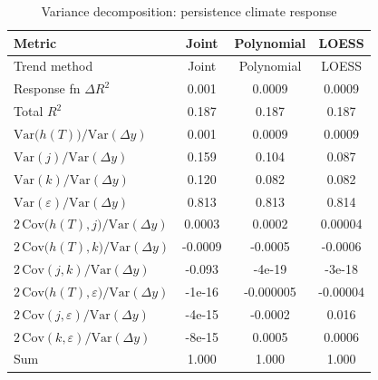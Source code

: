 \begin{table}[htbp]
\centering
\caption{Variance decomposition: persistence climate response}
\label{tab:variance_decomp_persistence}

\small
\begin{tabular}{@{}lccc@{}}
\toprule
Metric & Joint & Polynomial & LOESS \\
\midrule
Trend method & Joint & Polynomial & LOESS \\
\midrule
Response fn $\Delta R^2$ & 0.001 & 0.0009 & 0.0009 \\
Total $R^2$ & 0.187 & 0.187 & 0.187 \\
\midrule
$\mathrm{Var}\!\big(h(T)\big)/\mathrm{Var}(\Delta y)$ & 0.001 & 0.0009 & 0.0009 \\
$\mathrm{Var}(j)/\mathrm{Var}(\Delta y)$ & 0.159 & 0.104 & 0.087 \\
$\mathrm{Var}(k)/\mathrm{Var}(\Delta y)$ & 0.120 & 0.082 & 0.082 \\
$\mathrm{Var}(\varepsilon)/\mathrm{Var}(\Delta y)$ & 0.813 & 0.813 & 0.814 \\
\midrule
$2\,\mathrm{Cov}\!\big(h(T),j\big)/\mathrm{Var}(\Delta y)$ & 0.0003 & 0.0002 & 0.00004 \\
$2\,\mathrm{Cov}\!\big(h(T),k\big)/\mathrm{Var}(\Delta y)$ & -0.0009 & -0.0005 & -0.0006 \\
$2\,\mathrm{Cov}(j,k)/\mathrm{Var}(\Delta y)$ & -0.093 & -4e-19 & -3e-18 \\
$2\,\mathrm{Cov}\!\big(h(T),\varepsilon\big)/\mathrm{Var}(\Delta y)$ & -1e-16 & -0.000005 & -0.00004 \\
$2\,\mathrm{Cov}(j,\varepsilon)/\mathrm{Var}(\Delta y)$ & -4e-15 & -0.0002 & 0.016 \\
$2\,\mathrm{Cov}(k,\varepsilon)/\mathrm{Var}(\Delta y)$ & -8e-15 & 0.0005 & 0.0006 \\
\midrule
Sum & 1.000 & 1.000 & 1.000 \\
\bottomrule
\end{tabular}
\end{table}
